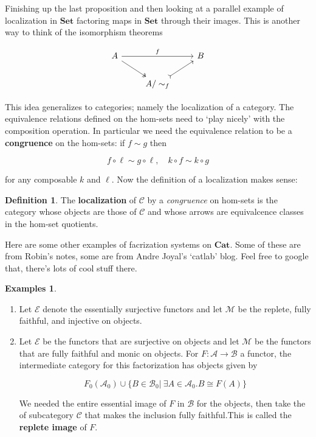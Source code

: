 \documentclass[11pt]{amsart}
\theoremstyle{plain}
\theoremstyle{definition}
\newtheorem{defn}[thm]{Definition}
\newtheorem*{egs*}{Examples}
\newcommand{\cA}{{\mathcal A}}
\newcommand{\cB}{{\mathcal B}}
\newcommand{\cC}{{\mathcal C}}
\newcommand{\cE}{{\mathcal E}}
\newcommand{\cM}{{\mathcal M}}
\newcommand{\Cat}{\mathbf{Cat}}
\newcommand{\Set}{{\mathbf{Set}}}
\newcommand{\noi}{{\noindent}}
\begin{document}
Finishing up the last proposition and then looking at a parallel example of localization in $\Set$ factoring maps in $\Set$ through their images. This is another way to think of the isomorphism theorems 

\[ \begin{tikzcd}
  A \ar[dr,two heads] \rar[rr, "f"] &&B \\
  & A/ \sim_f \ar[ur, tail] &
\end{tikzcd}\]

\noi This idea generalizes to categories; namely the localization of a category. The equivalence relations defined on the hom-sets need to `play nicely' with the composition operation. In particular we need the equivalence relation to be a \textbf{congruence} on the hom-sets: if $f \sim g$ then 

\[ f \circ \ell \sim g \circ \ell , \quad k \circ f \sim k \circ g \]

\noi for any composable $k$ and $\ell$. Now the definition of a localization makes sense: 


\begin{defn}
The \textbf{localization} of $\cC$ by a \textit{congruence} on hom-sets is the category whose objects are those of $\cC$ and whose arrows are equivalcence classes in the hom-set quotients. 
\end{defn}  

Here are some other examples of facrization systems on $\Cat$. Some of these are from Robin's notes, some are from Andre Joyal's `catlab' blog. Feel free to google that, there's lots of cool stuff there.

\begin{egs*}
\begin{enumerate}
\item Let $\cE$ denote the essentially surjective functors and let $\cM$ be the replete, fully faithful, and injective on objects.  \medskip  
\item Let $\cE$ be the functors that are surjective on objects and let $\cM$ be the functors that are fully faithful and monic on objects. For $F : \cA \to \cB$ a functor, the intermediate category for this factorization has objects given by 

\[ F_0(\cA_0) \cup \{ B \in \cB_0 | \ \exists A \in \cA_0 . B \cong F(A)  \}\] 

\noi We needed the entire essential image of $F$ in $\cB$ for the objects, then take the of subcategory  $\cC$ that makes the inclusion fully faithful.This is called the \textbf{replete image} of $F$. \medskip 
\end{enumerate}
\end{egs*}
\end{document}
